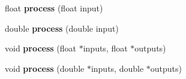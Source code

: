 \begin{DoxyCompactItemize}
\item 
\hypertarget{class_cicm_qsgs_a80a0504cf19c8bced93bfb5d161c086f}{float {\bfseries process} (float input)}\label{class_cicm_qsgs_a80a0504cf19c8bced93bfb5d161c086f}

\item 
\hypertarget{class_cicm_qsgs_a2f02e64b8778d29333f6e462d590a12c}{double {\bfseries process} (double input)}\label{class_cicm_qsgs_a2f02e64b8778d29333f6e462d590a12c}

\item 
\hypertarget{class_cicm_qsgs_af1101863b1362fc60144b42ae3700795}{void {\bfseries process} (float $\ast$inputs, float $\ast$outputs)}\label{class_cicm_qsgs_af1101863b1362fc60144b42ae3700795}

\item 
\hypertarget{class_cicm_qsgs_ae1a328c9a694c070baf1351e3af5b9a8}{void {\bfseries process} (double $\ast$inputs, double $\ast$outputs)}\label{class_cicm_qsgs_ae1a328c9a694c070baf1351e3af5b9a8}

\end{DoxyCompactItemize}
